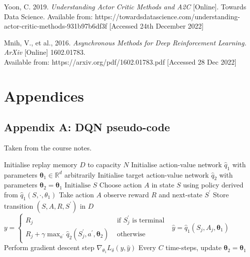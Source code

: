 \documentclass{article}
\begin{document}
Yoon, C. 2019. \emph{Understanding Actor Critic Methods and A2C} [Online]. Towards Data Science. Available from: https://towardsdatascience.com/understanding-actor-critic-methods-931b97b6df3f [Accessed 24th December 2022]

Mnih, V., et al., 2016. \emph{Asynchronous Methods for Deep Reinforcement Learning. ArXiv} [Online] 1602.01783. \\
Available from: https://arxiv.org/pdf/1602.01783.pdf [Accessed 28 Dec 2022]

\normalsize
\newpage
\section*{Appendices}
\subsection*{Appendix A: DQN pseudo-code}
\label{dqn_pseudo}
Taken from the course notes.
\begin{algorithmic}[1]
\State Initialise replay memory $D$ to capacity $N$
\State Initialise action-value network $\hat{q}_{1}$ with parameters $\boldsymbol{\theta}_{1} \in \mathbb{R}^{d}$ arbitrarily
\State Initialise target action-value network $\hat{q}_{2}$ with parameters $\boldsymbol{\theta}_{2}=\boldsymbol{\theta}_{1}$
    \State $\text{Initialise } S$
        \State Choose action $A$ in state $S$ using policy derived from  $\hat{q}_{1}\left(S, \cdot, \theta_{1}\right)$
        \State Take action $A$ observe reward $R$ and next-state $S^{\prime}$
        \State Store transition $\left(S, A, R, S^{\prime}\right)$ in $D$
            \State $y= \begin{cases}R_{j} & \text { if } S_{j}^{\prime} \text { is terminal } \\ R_{j}+\gamma \max _{a^{\prime}} \hat{q}_{2}\left(S_{j}^{\prime}, a^{\prime}, \boldsymbol{\theta}_{2}\right) & \text { otherwise }\end{cases}$
            \State $\hat{y}=\hat{q}_{1}\left(S_{j}, A_{j}, \boldsymbol{\theta}_{1}\right)$
            \State Perform gradient descent step $\nabla_{\theta_{1}} L_{\delta}(y, \hat{y})$
        \EndFor
    \State Every $C$ time-steps, update $\boldsymbol{\theta}_{2}=\boldsymbol{\theta}_{1}$
    \EndFor
\EndFor
\end{algorithmic}
\end{document}
